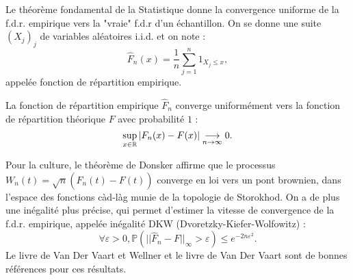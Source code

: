Le théorème fondamental de la Statistique donne la convergence uniforme de la f.d.r. empirique vers la "vraie" f.d.r d'un échantillon. On se donne une suite $(X_j)_j$ de variables aléatoires i.i.d. et on note : 
\[\hat F_n(x) = \frac{1}{n} \sum_{j=1}^n 1_{X_j\leq x},\]
appelée fonction de répartition empirique.

\begin{thm}
La fonction de répartition empirique $\hat F_n$ converge uniformément vers la fonction de répartition théorique $F$ avec probabilité $1$ :
\[\sup_{x\in \mathbb R} |F_n(x)-F(x)| \underset{n\to\infty}{\longrightarrow} 0.\]
\end{thm}

Pour la culture, le théorème de Donsker affirme que le processus $W_n(t) = \sqrt{n}(\hat F_n(t)-F(t))$ converge en loi vers un pont brownien, dans l'espace des fonctions càd-làg munie de la topologie de Storokhod. On a de plus une inégalité plus précise, qui permet d'estimer la vitesse de convergence de la f.d.r. empirique, appelée inégalité DKW (Dvoretzky-Kiefer-Wolfowitz) :
\[\forall \varepsilon>0, \mathbb{P}(||\hat F_n -F||_\infty>\varepsilon)\leq e^{-2n\varepsilon^2}.\] 
Le livre de Van Der Vaart et Wellner \cite{VDVWellner} et le livre de Van Der Vaart \cite{VDV} sont de bonnes références pour ces résultats. 
